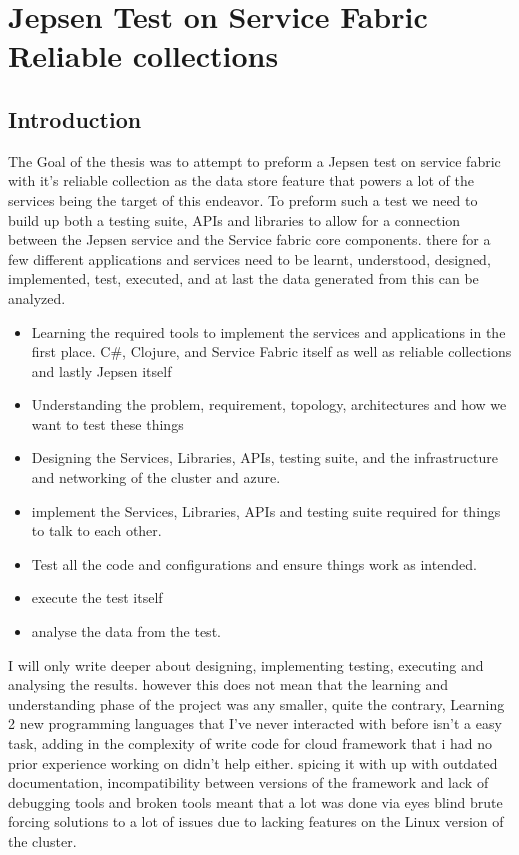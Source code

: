 \documentclass[a4paper,10pt,titlepage]{report}
\begin{document}
    \chapter{Jepsen Test on Service Fabric Reliable collections}


    \section{Introduction}

    The Goal of the thesis was to attempt to preform a Jepsen test on service fabric with it's reliable collection as the data store feature that powers a lot of the services being the target of this endeavor. To preform such a test we need to build up both a testing suite, APIs and libraries to allow for a connection between the Jepsen service and the Service fabric core components. there for a few different applications and services need to be learnt, understood, designed, implemented, test, executed, and at last the data generated from this can be analyzed.
    \begin{itemize}
        \item Learning the required tools to implement the services and applications in the first place. C\#, Clojure, and Service Fabric itself as well as reliable collections and lastly Jepsen itself
        \item Understanding the problem, requirement, topology, architectures and how we want to test these things
        \item Designing the Services, Libraries, APIs, testing suite, and the infrastructure and networking of the cluster and azure.
        \item implement the Services, Libraries, APIs and testing suite required for things to talk to each other.
        \item Test all the code and configurations and ensure things work as intended.
        \item execute the test itself
        \item analyse the data from the test.
    \end{itemize}

    I will only write deeper about designing, implementing testing, executing and analysing the results. however this does not mean that the learning and understanding phase of the project was any smaller, quite the contrary, Learning 2 new programming languages that I've never interacted with before isn't a easy task, adding in the complexity of write code for cloud framework that i had no prior experience working on didn't help either. spicing it with up with outdated documentation, incompatibility between versions of the framework and lack of debugging tools and broken tools meant that a lot was done via eyes blind brute forcing solutions to a lot of issues due to lacking features on the Linux version of the cluster.\\
\end{document}
